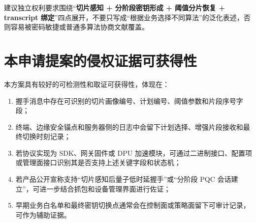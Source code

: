 \documentclass[12pt,a4paper]{article}
\begin{document}
建议独立权利要求围绕“\textbf{切片感知 + 分阶段密钥形成 + 阈值分片恢复 + transcript 绑定}”四点展开，不要只写成“根据业务选择不同算法”的泛化表述，否则容易被密码敏捷或普通多算法协商文献覆盖。

\section{本申请提案的侵权证据可获得性}

本方案具有较好的可检测性和取证可获得性，体现在：

\begin{enumerate}[leftmargin=2em]
    \item 握手消息中存在可识别的切片画像编号、计划编号、阈值参数和片段序号字段；
    \item 终端、边缘安全锚点和服务器侧的日志中会留下计划选择、增强片段接收和最终切换时刻记录；
    \item 若协议实现为 SDK、网关固件或 DPU 加速模块，可通过二进制接口、配置项或管理面接口识别其是否支持上述关键字段和状态机；
    \item 若产品公开宣称支持“切片感知后量子低时延握手”或“分阶段 PQC 会话建立”，可进一步结合抓包和设备管理界面进行佐证；
    \item 早期业务白名单和最终密钥切换点通常会在控制面或策略面留下可审计记录，可作为辅助证据。
\end{enumerate}
\end{document}
